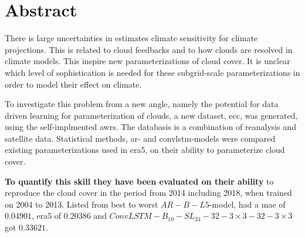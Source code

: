 \chapter*{Abstract}

There is large uncertainties in estimates climate sensitivity for climate projections. This is related to cloud feedbacks and to how clouds are resolved in climate models. 
This inspire new parameterizations of cloud cover. It is unclear which level of sophistication is needed for these subgrid-scale parameterizations in order to model their effect on climate.

To investigate this problem from a new angle, namely the potential for data driven learning for parameterization of clouds, a new dataset, \acrfull{ecc}, was generated, using the self-implmented \acrfull{awrs}. The databasis is a combination of reanalysis and satellite data. %
Statistical methods, \acrfull{ar}- and \acrfull{convlstm}-models were compared existing parameterizations used in \acrshort{era5}, on their ability to parameterize cloud cover. 

\textbf{To quantify this skill they have been evaluated on their ability} to reproduce the cloud cover in the period from 2014 including 2018, when trained on 2004 to 2013. Listed from best to worst 
$AR-B-L5$-model, had a \acrshort{mae} of $0.04901$, \acrshort{era5} of $0.20386$ and $ConvLSTM-B_{10}-SL_{24}-32-3\times3-32-3 \times3$ got $0.33621$.

